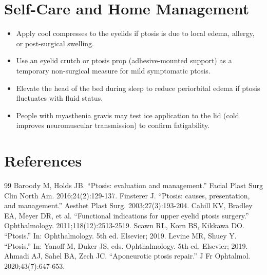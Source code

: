 \section*{Self-Care and Home Management}
\begin{itemize}
  \item Apply cool compresses to the eyelids if ptosis is due to local edema, allergy, or post-surgical swelling.
  \item Use an eyelid crutch or ptosis prop (adhesive-mounted support) as a temporary non-surgical measure for mild symptomatic ptosis.
  \item Elevate the head of the bed during sleep to reduce periorbital edema if ptosis fluctuates with fluid status.
  \item People with myasthenia gravis may test ice application to the lid (cold improves neuromuscular transmission) to confirm fatigability.
\end{itemize}

\section*{References}
\begin{thebibliography}{99}
 Baroody M, Holds JB. ``Ptosis: evaluation and management.'' Facial Plast Surg Clin North Am. 2016;24(2):129-137.
 Finsterer J. ``Ptosis: causes, presentation, and management.'' Aesthet Plast Surg. 2003;27(3):193-204.
 Cahill KV, Bradley EA, Meyer DR, et al. ``Functional indications for upper eyelid ptosis surgery.'' Ophthalmology. 2011;118(12):2513-2519.
 Scawn RL, Korn BS, Kikkawa DO. ``Ptosis.'' In: Ophthalmology. 5th ed. Elsevier; 2019.
 Levine MR, Shuey Y. ``Ptosis.'' In: Yanoff M, Duker JS, eds. Ophthalmology. 5th ed. Elsevier; 2019.
 Ahmadi AJ, Sahel BA, Zech JC. ``Aponeurotic ptosis repair.'' J Fr Ophtalmol. 2020;43(7):647-653.
\end{thebibliography}
